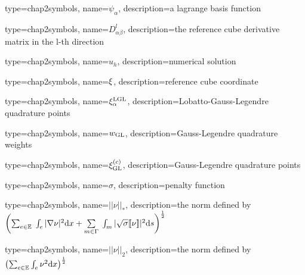                  {
                   type=chap2symbols,
                   name=$\psi_\alpha$,
                   description={a lagrange basis function}
                 }

                 {
                   type=chap2symbols,
                   name=$D^l_{\alpha\beta}$,
                   description={the reference cube derivative matrix in the l-th direction}
                 }



                 {
                   type=chap2symbols,
                   name=$u_h$,
                   description={numerical solution}
                 }


                 {
                   type=chap2symbols,
                   name=$\boldmath{\xi}$,
                   description={reference cube coordinate}
                 }


                 {
                   type=chap2symbols,
                   name=$\xi_\alpha^{\rm LGL}$,
                   description={Lobatto-Gauss-Legendre quadrature points}
                 }


                 {
                   type=chap2symbols,
                   name=$w_{\rm GL}$,
                   description={Gauss-Legendre quadrature weights}
                 }

                 {
                   type=chap2symbols,
                   name=$\xi^{(c)}_{\rm GL}$,
                   description={Gauss-Legendre quadrature points}
                 }


                 {
                   type=chap2symbols,
                   name=$\sigma$,
                   description={penalty function}
                 }


                 {
                   type=chap2symbols,
                   name=$||\nu||_{*}$,
                   description={the norm defined by $\left(\sum_{\substack{e \in \mathbb{E}}}\; \int_e |\nabla \nu |^{2} \mathrm{d}\boldmath {x} + \sum\limits_{m \in \Gamma}\; \int_m|\sqrt{\sigma} \llbracket \nu \rrbracket |^{2} \mathrm{d} \boldmath s \right)^{\frac{1}{2}}$}
                 }


                 {
                   type=chap2symbols,
                   name=$||\nu||_{2}$,
                   description={the norm defined by  $\left(\sum_{\substack{e \in \mathbb{E}}}\int_{e}\nu^2\mathrm{d}\boldmath{x}\right)^{\frac{1}{2}}$}
                 }


